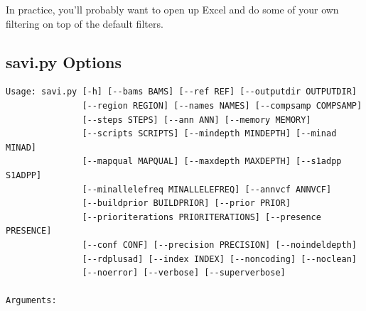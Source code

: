 \documentclass[letterpaper,14pt]{memoir}
\begin{document}
\noindent In practice, you'll probably want to open up Excel and do some of your own filtering on top of the default filters.

\subsection{savi.py Options}\label{savi.py}

\begin{Verbatim}[fontsize=\small]
Usage: savi.py [-h] [--bams BAMS] [--ref REF] [--outputdir OUTPUTDIR]
               [--region REGION] [--names NAMES] [--compsamp COMPSAMP]
               [--steps STEPS] [--ann ANN] [--memory MEMORY]
               [--scripts SCRIPTS] [--mindepth MINDEPTH] [--minad MINAD]
               [--mapqual MAPQUAL] [--maxdepth MAXDEPTH] [--s1adpp S1ADPP]
               [--minallelefreq MINALLELEFREQ] [--annvcf ANNVCF]
               [--buildprior BUILDPRIOR] [--prior PRIOR]
               [--prioriterations PRIORITERATIONS] [--presence PRESENCE]
               [--conf CONF] [--precision PRECISION] [--noindeldepth]
               [--rdplusad] [--index INDEX] [--noncoding] [--noclean]
               [--noerror] [--verbose] [--superverbose]

Arguments:


\end{Verbatim}
\end{document}
